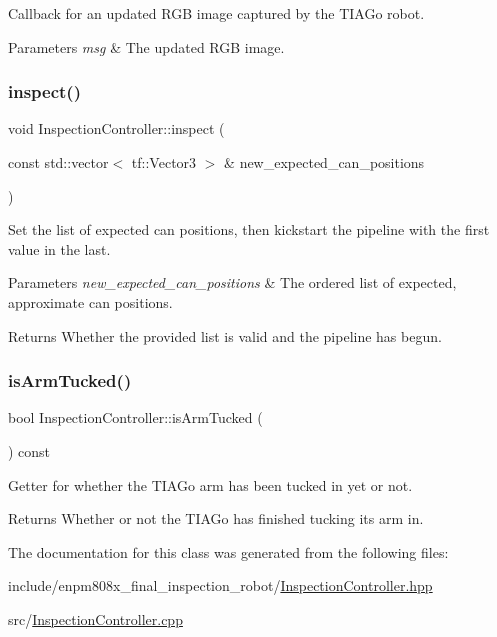 Callback for an updated R\+GB image captured by the T\+I\+A\+Go robot. 
\begin{DoxyParams}{Parameters}
{\em msg} & The updated R\+GB image. \\
\hline
\end{DoxyParams}
\mbox{\label{classInspectionController_a06e3e7749ede8c15dfff60ebbd5c5d79}} 
\subsubsection{\texorpdfstring{inspect()}{inspect()}}
{\footnotesize\ttfamily void Inspection\+Controller\+::inspect (\begin{DoxyParamCaption}\item[{const std\+::vector$<$ tf\+::\+Vector3 $>$ \&}]{new\+\_\+expected\+\_\+can\+\_\+positions }\end{DoxyParamCaption})}

Set the list of expected can positions, then kickstart the pipeline with the first value in the last. 
\begin{DoxyParams}{Parameters}
{\em new\+\_\+expected\+\_\+can\+\_\+positions} & The ordered list of expected, approximate can positions. \\
\hline
\end{DoxyParams}
\begin{DoxyReturn}{Returns}
Whether the provided list is valid and the pipeline has begun. 
\end{DoxyReturn}
\mbox{\label{classInspectionController_a6be39aa4b5e8b6ea62b1b90285c7ff64}} 
\subsubsection{\texorpdfstring{is\+Arm\+Tucked()}{isArmTucked()}}
{\footnotesize\ttfamily bool Inspection\+Controller\+::is\+Arm\+Tucked (\begin{DoxyParamCaption}{ }\end{DoxyParamCaption}) const}

Getter for whether the T\+I\+A\+Go arm has been tucked in yet or not. \begin{DoxyReturn}{Returns}
Whether or not the T\+I\+A\+Go has finished tucking its arm in. 
\end{DoxyReturn}


The documentation for this class was generated from the following files\+:\begin{DoxyCompactItemize}
\item 
include/enpm808x\+\_\+final\+\_\+inspection\+\_\+robot/\hyperlink{InspectionController_8hpp}{Inspection\+Controller.\+hpp}\item 
src/\hyperlink{InspectionController_8cpp}{Inspection\+Controller.\+cpp}\end{DoxyCompactItemize}
